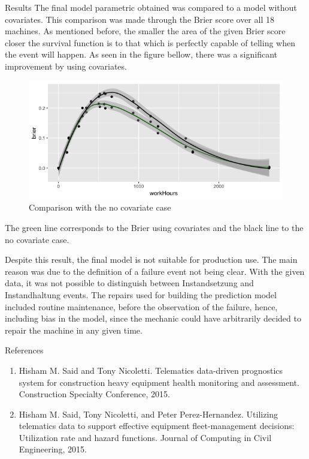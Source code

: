 \documentclass[t]{beamer}
\begin{document}
\begin{frame}[label={sec:orgc2b2963}]{}
\begin{columns}
\begin{column}{0.3\columnwidth}
\begin{block}{Results}
The final model parametric obtained was compared to a model without covariates. This comparison
was made through the Brier score over all 18 machines. As mentioned before, the smaller the area of the
given Brier score closer the survival function is to that which is perfectly capable of telling
when the event will happen. As seen in the figure bellow, there was a significant improvement by using covariates.
\begin{figure}[htbp]
\centering
\includegraphics[width=.9\linewidth]{./Logos/finalbrier2.png}
\caption{\label{fig:orgfe2439b}
Comparison with the no covariate case}
\end{figure}
    The green line corresponds to the Brier using covariates and the black line to the no covariate case. 

    Despite this result, the final model is not suitable for production use. The main reason was due to the definition of a failure
    event not being clear. With the given data, it was not possible to distinguish between Instandsetzung and Instandhaltung events. 
    The repairs used for building the prediction model included routine maintenance,
    before the observation of the failure, hence, including bias in the model, since the mechanic could have 
    arbitrarily decided to repair the machine in any given time. 
\end{block}
\begin{block}{References}
\begin{enumerate}
\item Hisham M. Said and Tony Nicoletti. Telematics data-driven prognostics system for construction heavy equipment health monitoring and assessment. Construction Specialty Conference, 2015.
\item Hisham M. Said, Tony Nicoletti, and Peter Perez-Hernandez. Utilizing telematics data to support effective equipment fleet-management decisions: Utilization rate and hazard functions. Journal of Computing in Civil Engineering, 2015.
\end{enumerate}
\end{block}
\end{column}
\end{columns}
\end{frame}
\end{document}

